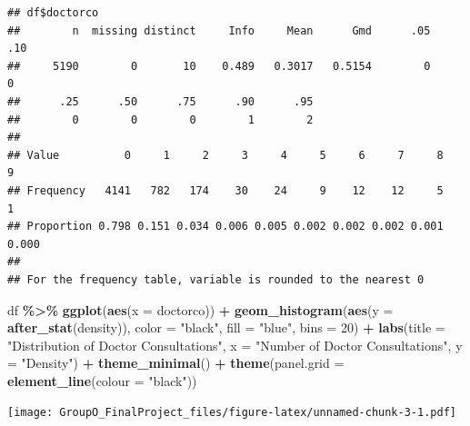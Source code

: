 \documentclass[
]{article}
\newenvironment{Shaded}{\begin{snugshade}}{\end{snugshade}}
\newcommand{\AttributeTok}[1]{\textcolor[rgb]{0.13,0.29,0.53}{#1}}
\newcommand{\CommentTok}[1]{\textcolor[rgb]{0.56,0.35,0.01}{\textit{#1}}}
\newcommand{\DecValTok}[1]{\textcolor[rgb]{0.00,0.00,0.81}{#1}}
\newcommand{\FunctionTok}[1]{\textcolor[rgb]{0.13,0.29,0.53}{\textbf{#1}}}
\newcommand{\NormalTok}[1]{#1}
\newcommand{\SpecialCharTok}[1]{\textcolor[rgb]{0.81,0.36,0.00}{\textbf{#1}}}
\newcommand{\StringTok}[1]{\textcolor[rgb]{0.31,0.60,0.02}{#1}}
\begin{document}
\begin{Shaded}
\end{Shaded}

\begin{verbatim}
## df$doctorco 
##        n  missing distinct     Info     Mean      Gmd      .05      .10 
##     5190        0       10    0.489   0.3017   0.5154        0        0 
##      .25      .50      .75      .90      .95 
##        0        0        0        1        2 
##                                                                       
## Value          0     1     2     3     4     5     6     7     8     9
## Frequency   4141   782   174    30    24     9    12    12     5     1
## Proportion 0.798 0.151 0.034 0.006 0.005 0.002 0.002 0.002 0.001 0.000
## 
## For the frequency table, variable is rounded to the nearest 0
\end{verbatim}

\begin{Shaded}
\begin{Highlighting}[]
\NormalTok{df }\SpecialCharTok{\%\textgreater{}\%}
  \FunctionTok{ggplot}\NormalTok{(}\FunctionTok{aes}\NormalTok{(}\AttributeTok{x =}\NormalTok{ doctorco)) }\SpecialCharTok{+}
  \FunctionTok{geom\_histogram}\NormalTok{(}\FunctionTok{aes}\NormalTok{(}\AttributeTok{y =} \FunctionTok{after\_stat}\NormalTok{(density)), }\AttributeTok{color =} \StringTok{"black"}\NormalTok{, }\AttributeTok{fill =} \StringTok{"blue"}\NormalTok{, }\AttributeTok{bins =} \DecValTok{20}\NormalTok{) }\SpecialCharTok{+}
  \FunctionTok{labs}\NormalTok{(}\AttributeTok{title =} \StringTok{"Distribution of Doctor Consultations"}\NormalTok{,}
       \AttributeTok{x =} \StringTok{"Number of Doctor Consultations"}\NormalTok{,}
       \AttributeTok{y =} \StringTok{"Density"}\NormalTok{) }\SpecialCharTok{+}
  \FunctionTok{theme\_minimal}\NormalTok{() }\SpecialCharTok{+}
  \FunctionTok{theme}\NormalTok{(}\AttributeTok{panel.grid =} \FunctionTok{element\_line}\NormalTok{(}\AttributeTok{colour =} \StringTok{"black"}\NormalTok{))}
\end{Highlighting}
\end{Shaded}

\texttt{[image: GroupO\_FinalProject\_files/figure-latex/unnamed-chunk-3-1.pdf]}

\begin{Shaded}
\end{Shaded}
\end{document}
